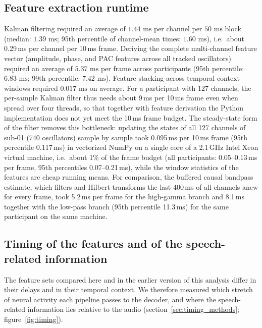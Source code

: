 \documentclass{iopjournal}
\begin{document}
\subsection{Feature extraction runtime}

Kalman filtering required an average of $1.44\text{ ms}$ per channel per $50\text{ ms}$ block (median: $1.39\text{ ms}$; 95th percentile of channel-mean times: $1.60\text{ ms}$), i.e.\ about 0.29\,ms per channel per 10\,ms frame. Deriving the complete multi-channel feature vector (amplitude, phase, and PAC features across all tracked oscillators) required an average of $5.37\text{ ms}$ per frame across participants (95th percentile: $6.83\text{ ms}$; 99th percentile: $7.42\text{ ms}$). Feature stacking across temporal context windows required $0.017\text{ ms}$ on average. For a participant with 127 channels, the per-sample Kalman filter thus needs about 9\,ms per 10\,ms frame even when spread over four threads, so that together with feature derivation the Python implementation does not yet meet the 10\,ms frame budget. The steady-state form of the filter removes this bottleneck: updating the states of all 127 channels of sub-01 (740 oscillators) sample by sample took 0.095\,ms per 10\,ms frame (95th percentile 0.117\,ms) in vectorized NumPy on a single core of a 2.1\,GHz Intel Xeon virtual machine, i.e.\ about 1\% of the frame budget (all participants: 0.05--0.13\,ms per frame, 95th percentiles 0.07--0.21\,ms), while the window statistics of the features are cheap running means. For comparison, the buffered causal bandpass estimate, which filters and Hilbert-transforms the last 400\,ms of all channels anew for every frame, took 5.2\,ms per frame for the high-gamma branch and 8.1\,ms together with the low-pass branch (95th percentile 11.3\,ms) for the same participant on the same machine.

\subsection{Timing of the features and of the speech-related information}
\label{sec:res_timing}

The feature sets compared here and in the earlier version of this analysis differ in their delays and in their temporal context. We therefore measured which stretch of neural activity each pipeline passes to the decoder, and where the speech-related information lies relative to the audio (section~\ref{sec:timing_methods}; figure~\ref{fig:timing}).
\end{document}
